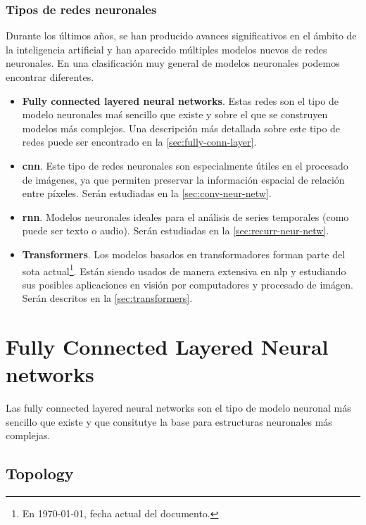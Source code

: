 \subsubsection{Tipos de redes neuronales}
Durante los últimos años, se han producido avances significativos en el ámbito
de la inteligencia artificial y han aparecido múltiples modelos nuevos de redes
neuronales. En una clasificación muy general de modelos neuronales podemos
encontrar diferentes.

\begin{itemize}
  \item \textbf{Fully connected layered neural networks}. Estas redes son el
  tipo de modelo neuronales maś sencillo que existe y sobre el que se
  construyen modelos más complejos. Una descripción más detallada sobre este
  tipo de redes puede ser encontrado en la \vref{sec:fully-conn-layer}.
  \item \textbf{\acrlong*{cnn}}. Este tipo de redes neuronales son
  especialmente útiles en el procesado de imágenes, ya que permiten preservar
  la información espacial de relación entre píxeles. Serán estudiadas en la
  \vref{sec:conv-neur-netw}.
  \item \textbf{\acrlong*{rnn}}. Modelos neuronales ideales para el análisis
  de series temporales (como puede ser texto o audio). Serán estudiadas en la
  \vref{sec:recurr-neur-netw}.
  \item \textbf{Transformers}. Los modelos basados en transformadores forman
  parte del \acrlong{sota} actual\footnote{En \today, fecha actual del
    documento.}. Están siendo usados de manera extensiva en \gls{nlp} y
  estudiando sus posibles aplicaciones en visión por computadores y procesado
  de imágen. Serán descritos en la \vref{sec:transformers}.
\end{itemize}


\section{Fully Connected Layered Neural networks}
\label{sec:fully-conn-layer}

Las fully connected layered neural networks son el tipo de modelo neuronal más
sencillo que existe y que consitutye la base para estructuras neuronales más
complejas.

\subsection{Topology}
\label{sec:topology}

